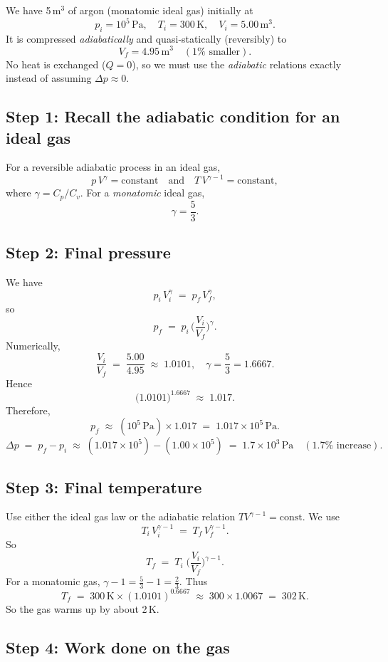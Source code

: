 \documentclass[12pt]{article}
\theoremstyle{definition} %
\theoremstyle{plain} %
\begin{document}
We have 5\,m\(^3\) of argon (monatomic ideal gas) initially at
\[
p_i = 10^5\,\mathrm{Pa}, 
\quad
T_i = 300\,\mathrm{K},
\quad
V_i = 5.00\,\mathrm{m^3}.
\]
It is compressed \emph{adiabatically} and quasi‐statically (reversibly) to 
\[
V_f = 4.95\,\mathrm{m^3}\quad(1\%\text{ smaller}).
\]
No heat is exchanged (\(Q=0\)), so we must use the \emph{adiabatic} relations exactly instead of assuming \(\Delta p \approx 0\).

\subsection*{Step 1: Recall the adiabatic condition for an ideal gas}

For a reversible adiabatic process in an ideal gas,
\[
p \, V^\gamma = \text{constant}
\quad\text{and}\quad
T \, V^{\gamma - 1} = \text{constant},
\]
where
\(\gamma = C_p / C_v\).  For a \emph{monatomic} ideal gas, 
\[
\gamma = \frac{5}{3}.
\]

\subsection*{Step 2: Final pressure}

We have
\[
p_i\,V_i^\gamma \;=\; p_f\,V_f^\gamma,
\]
so
\[
p_f
\;=\;
p_i \,\biggl(\frac{V_i}{V_f}\biggr)^\gamma.
\]
Numerically,
\[
\frac{V_i}{V_f}
\;=\;
\frac{5.00}{4.95}
\;\approx\;
1.0101,
\quad
\gamma=\frac{5}{3}=1.6667.
\]
Hence
\[
\bigl(1.0101\bigr)^{1.6667}
\;\approx\;
1.017.
\]
Therefore,
\[
p_f
\;\approx\;
(10^5\,\mathrm{Pa})\times 1.017
\;=\;
1.017\times10^5\,\mathrm{Pa}.
\]
\[
\Delta p
\;=\;
p_f - p_i
\;\approx\;
(1.017\times10^5) - (1.00\times10^5)
\;=\;
1.7\times10^3\,\mathrm{Pa}
\quad(1.7\%\text{ increase}).
\]

\subsection*{Step 3: Final temperature}

Use either the ideal gas law or the adiabatic relation \(T V^{\gamma-1} = \mathrm{const}\).  We use
\[
T_i\,V_i^{\gamma-1}
\;=\;
T_f\,V_f^{\gamma-1}.
\]
So
\[
T_f
\;=\;
T_i \;\biggl(\!\frac{V_i}{V_f}\!\biggr)^{\gamma-1}.
\]
For a monatomic gas, \(\gamma-1=\tfrac{5}{3}-1=\tfrac{2}{3}\). Thus
\[
T_f
\;=\;
300\,\mathrm{K}\times
(1.0101)^{0.6667}
\;\approx\;
300\times1.0067
\;=\;
302\,\mathrm{K}.
\]
So the gas warms up by about 2\,K.

\subsection*{Step 4: Work done on the gas}
\end{document}
